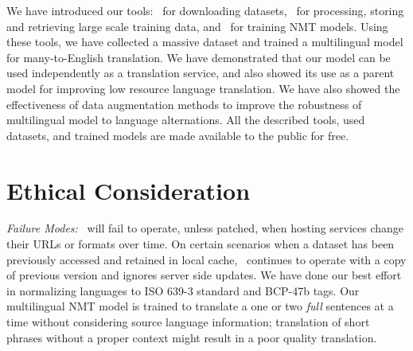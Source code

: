 We have introduced our tools: \mtdata\ for downloading datasets, \nlcodec\ for processing, storing and retrieving large scale training data, and \rtg\ for training NMT models.
Using these tools, we have collected a massive dataset and trained a multilingual model for many-to-English translation.
We have demonstrated that our model can be used independently as a translation service, and also showed its use as a parent model for improving low resource language translation. 
We have also showed the effectiveness of data augmentation methods to improve the robustness of multilingual model to language alternations.  
All the described tools, used datasets, and trained models are made available to the public for free. 



\section*{Ethical Consideration}

\textit{Failure Modes:} \mtdata\ will fail to operate, unless patched, when hosting services change their URLs or formats over time.
On certain scenarios when a dataset has been previously accessed and retained in local cache, \mtdata\ continues to operate with a copy of previous version and ignores server side updates.
We have done our best effort in normalizing languages to ISO 639-3 standard and BCP-47b tags. 
Our multilingual NMT model is trained to translate a one or two \textit{full} sentences at a time without considering source language information; translation of short phrases without a proper context might result in a poor quality translation. 

